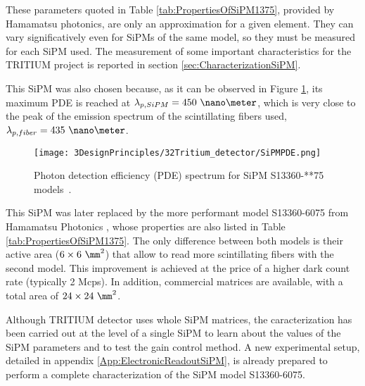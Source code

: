 These parameters quoted in Table \ref{tab:PropertiesOfSiPM1375}, provided by Hamamatsu photonics, are only an approximation for a given element. They can vary significatively even for SiPMs of the same model, so they must be measured for each SiPM used. The measurement of some important characteristics for the TRITIUM project is reported in section \ref{sec:CharacterizationSiPM}. 

This SiPM was also chosen because, as it can be observed in Figure \ref{fig:PDESiPM}, its maximum PDE is reached at $\lambda_{p,SiPM}=450~\nano\meter$, which is very close to the peak of the emission spectrum of the scintillating fibers used, $\lambda_{p,fiber}=435~\nano\meter$.

\begin{figure}[htbp]
\centering
\texttt{[image: 3DesignPrinciples/32Tritium\_detector/SiPMPDE.png]}
\caption{Photon detection efficiency (PDE) spectrum for SiPM S13360-**75 models~\cite{DataSheetHammamatsu_1_SiPM_1375}.\label{fig:PDESiPM}}
\end{figure}

This SiPM was later replaced by the more performant model S13360-6075 from Hamamatsu Photonics \cite{DataSheetHammamatsu_1_SiPM_75}, whose properties are also listed in Table \ref{tab:PropertiesOfSiPM1375}. The only difference between both models is their active area ($6\times6~\mm^2$) that allow to read more scintillating fibers with the second model. This improvement is achieved at the price of a higher dark count rate (typically 2 Mcps). In addition, commercial matrices are available, with a total area of $24\times24~\mm^2$.

Although TRITIUM detector uses whole SiPM matrices, the caracterization has been carried out at the level of a single SiPM to learn about the values of the SiPM parameters and to test the gain control method. A new experimental setup, detailed in appendix \ref{App:ElectronicReadoutSiPM}, is already  prepared to perform a complete characterization of the SiPM model S13360-6075.